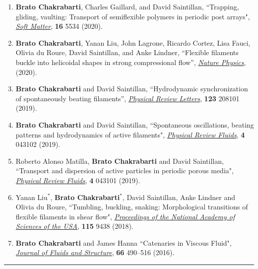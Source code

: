\documentclass[10pt]{res} %
\begin{document}
\begin{resume}
\begin{enumerate}[topsep=0pt,itemsep= 1ex]
\item \textbf{Brato Chakrabarti}, Charles Gaillard, and David Saintillan, ``Trapping, gliding, vaulting: Transport of semiflexible polymers in periodic post arrays", \href{DOI	https://doi.org/10.1039/D0SM00390E}{\textit{Soft Matter}}, \textbf{16} 5534 (2020).


\item \textbf{Brato Chakrabarti}, Yanan Liu, John Lagrone, Ricardo Cortez, Lisa Fauci, Olivia du Roure, David Saintillan, and Anke Lindner, ``Flexible filaments buckle into helicoidal shapes in strong compressional flow'',  \href{https://doi.org/10.1038/s41567-020-0843-7}{\textit{Nature Physics}}, (2020).

\item \textbf{Brato Chakrabarti} and David Saintillan, ``Hydrodynamic synchronization of spontaneously beating filaments'', \href{https://doi.org/10.1103/PhysRevLett.123.208101}{\textit{Physical Review Letters}}, \textbf{123} 208101 (2019). 


\item \textbf{Brato Chakrabarti} and David Saintillan, ``Spontaneous oscillations, beating patterns and hydrodynamics of active filaments", \href{https://doi.org/10.1103/PhysRevFluids.4.043102}{\textit{Physical Review Fluids}}, \textbf{4} 043102 (2019). 


\item Roberto Alonso Matilla, \textbf{Brato Chakrabarti} and David Saintillan, ``Transport and dispersion of active particles in periodic porous media", \href{https://doi.org/10.1103/PhysRevFluids.4.043101}{\textit{Physical Review Fluids}}, \textbf{4} 043101 (2019). 

\item Yanan Liu$^*$, \textbf{Brato Chakrabarti}$^*$, David Saintillan, Anke Lindner and Olivia du Roure, ``Tumbling, buckling, snaking: Morphological transitions
of flexible filaments in shear flow", \href{https://doi.org/10.1073/pnas.1805399115}{\textit{Proceedings of the National Academy of Sciences of the USA}}, \textbf{115} 9438 (2018).


\item \textbf{Brato Chakrabarti} and James Hanna ``Catenaries in Viscous Fluid", \href{https://doi.org/10.1016/j.jfluidstructs.2016.04.009}{\textit{Journal of Fluids and Structure}}, \textbf{66} 490–516 (2016).
\end{enumerate}


\vspace*{-2mm}
\noindent\rule{\textwidth}{0.6pt}
\vspace*{-10mm}

\end{resume}
\end{document}
